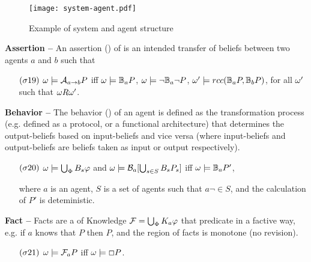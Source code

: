 \begin{figure}[t]
	\centering
	\texttt{[image: system-agent.pdf]}
	\caption{Example of system and agent structure}
	\label{fig:system-agent}
\end{figure}

\begin{definition}{\bf Assertion -- }\label{def:assertion}
	An assertion () of  is an intended transfer of beliefs between
	two agents $a$ and $b$ such that
	\begin{enumerate}[noitemsep]
		\item[$(\sigma19)$] $\omega\models\mathcal{A}_{a\rightarrow b}P$ iff
			$\omega\models\mathbb{B}_{a}{P}$, 
			$\omega\models\neg\mathbb{B}_{a}{\neg P}$, 
			$\omega'\models rcc(\mathbb{B}_{a}{P},\mathbb{B}_{b}{P})$, 
			for all $\omega'$ such that $\omega R\omega'$.
	\end{enumerate}
\end{definition}

\begin{definition}{\bf Behavior -- }\label{def:behavior}
	The behavior () of an agent is defined as the transformation process (e.g. defined as a
	protocol, or a functional architecture) that determines the
	output-beliefs based on input-beliefs and vice versa (where input-beliefs and
	output-beliefs are beliefs taken as input or output respectively).
	\begin{enumerate}[noitemsep]
		\item[$(\sigma20)$] $\omega\models\bigcup_{\Phi}B_{s}\varphi$ and $\omega\models\mathcal{B}_{a}[\bigcup_{s\in S}B_{s}P_{s}]$ iff
			$\omega\models\mathbb{B}_{a}{P'}$, 
			
		where $a$ is an agent, $S$ is a set of agents such that $a\neg\in S$, and the calculation of $P'$ is deteministic.
	\end{enumerate}
\end{definition}

\begin{definition}{\bf Fact -- }\label{def:fact}
	Facts are a  of Knowledge $\mathcal{F} = \bigcup_\Phi K_{a}\varphi$
	that predicate in a factive way, e.g.
	if $a$ knows that $P$ then $P$, and the region of facts is monotone (no revision).
	\begin{enumerate}[noitemsep]
		\item[$(\sigma21)$] $\omega\models\mathcal{F}_{a}P$ iff
			$\omega \models \Box P$. 
	\end{enumerate}
\end{definition}

